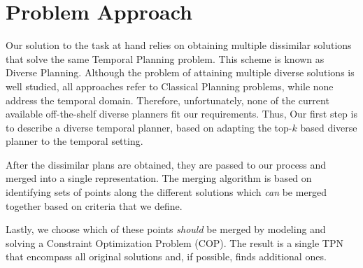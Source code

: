 \section{Problem Approach}
\label{intro: Problem Approach}

Our solution to the task at hand relies on obtaining multiple dissimilar solutions that solve the same Temporal Planning problem.
This scheme is known as Diverse Planning. Although the problem of attaining multiple diverse solutions is well studied, all approaches refer to Classical Planning problems, while none address the temporal domain. Therefore, unfortunately, none of the current available off-the-shelf diverse planners  \cite{bryce2014landmark,nguyen2012generating,srivastava2007domain,katz2019reshaping} fit our requirements. Thus, Our first step is to describe a diverse temporal planner, based on adapting the top-$k$ based diverse planner \cite{katz2019reshaping} to the temporal setting. 

After the dissimilar plans are obtained, they are passed to our process and merged into a single representation. 
The merging algorithm is based on identifying sets of points along the different solutions which \emph{can} be merged together based on criteria that we define.

Lastly, we choose which of these points \emph{should} be merged by modeling and solving a Constraint Optimization Problem (COP). The result is a single TPN that encompass all original solutions and, if possible, finds additional ones.



